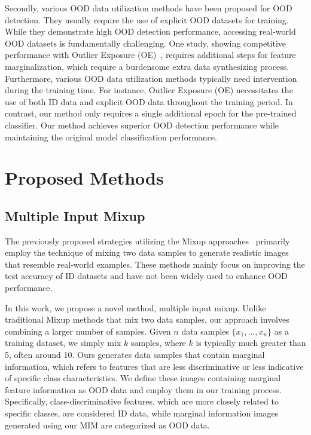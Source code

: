 \documentclass[letterpaper]{article} %
\begin{document}
Secondly, various OOD data utilization methods have been proposed for OOD detection.
They usually require the use of explicit OOD datasets for training.
While they demonstrate high OOD detection performance, accessing real-world OOD datasets is fundamentally challenging.
One study, showing competitive performance with Outlier Exposure (OE)~\cite{OE}, requires additional steps for feature marginalization, which require a burdensome extra data synthesizing process.
Furthermore, various OOD data utilization methods typically need intervention during the training time.
For instance, Outlier Exposure (OE) necessitates the use of both ID data and explicit OOD data throughout the training period.
In contrast, our method only requires a single additional epoch for the pre-trained classifier.
Our method achieves superior OOD detection performance while maintaining the original model classification performance.


\section{Proposed Methods}
\subsection{Multiple Input Mixup}

The previously proposed strategies utilizing the Mixup approaches~\cite{mixup, cutmix, manifoldmixup} primarily employ the technique of mixing two data samples to generate realistic images that resemble real-world examples. These methods mainly focus on improving the test accuracy of ID datasets and have not been widely used to enhance OOD performance.

In this work, we propose a novel method, multiple input mixup.
Unlike traditional Mixup methods that mix two data samples, our approach involves combining a larger number of samples.
Given $n$ data samples $\{x_1, \ldots, x_n\}$ as a training dataset, we simply mix $k$ samples, where $k$ is typically much greater than 5, often around 10.
Ours generates data samples that contain marginal information, which refers to features that are less discriminative or less indicative of specific class characteristics.
We define these images containing marginal feature information as OOD data and employ them in our training process.
Specifically, class-discriminative features, which are more closely related to specific classes, are considered ID data, while marginal information images generated using our MIM are categorized as OOD data.
\end{document}
